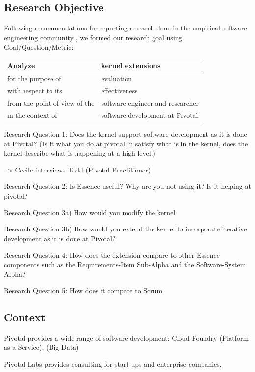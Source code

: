 \documentclass[preprint,12pt,3p]{elsarticle}
\begin{document}
\subsection{Research Objective}
Following recommendations for reporting research done in the empirical
software engineering community
\cite{GQM, Shaw}, we formed our
research goal using Goal/Question/Metric:
\cite{GQM}

\begin{table}[h]
\centering
\begin{tabular}{|p{2.00in}|p{4.10in}|}
\hline
Analyze & kernel extensions \\ \hline
for the purpose of & evaluation \\ \hline
with respect to its & effectiveness \\ \hline
from the point of view of the & software engineer and researcher \\ \hline
in the context of & software development at Pivotal. \\
\hline
\end{tabular}
\end{table}


Research Question 1: Does the kernel support software development as it is done at Pivotal? (Is it what you do at pivotal in satisfy what is in the kernel, does the kernel describe what is happening at a high level.)

--> Cecile interviews Todd (Pivotal Practitioner)

Research Question 2: Is Essence useful? Why are you not using it? Is it helping at pivotal? 

Research Question 3a) How would you modify the kernel 

Research Question 3b) How would you extend the kernel to incorporate iterative development as it is done at Pivotal?

Research Question 4: How does the extension compare to other Essence components such as the Requirements-Item Sub-Alpha and the Software-System Alpha? 

Research Question 5: How does it compare to Scrum


\subsection{Context}
Pivotal provides a wide range of software development: Cloud Foundry (Platform as a Service),  (Big Data)

Pivotal Labs provides consulting for start ups and enterprise companies.
\end{document}
